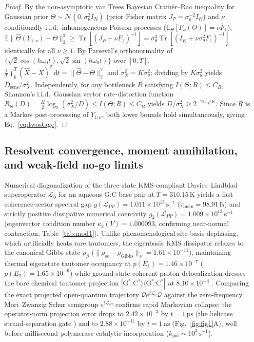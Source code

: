 \documentclass[10pt,letterpaper]{article}
\theoremstyle{plain}
\theoremstyle{definition}
\newcommand{\Lcal}{\mathcal{L}}
\newcommand{\Qcal}{\mathcal{Q}}
\newcommand{\Tr}{\operatorname{Tr}}
\begin{document}
\begin{proof}
By the non-asymptotic van Trees Bayesian Cram\'er--Rao inequality for Gaussian prior $\Theta \sim \mathcal{N}(0, \sigma_\theta^2 I_K)$ (prior Fisher matrix $J_P = \sigma_\theta^{-2}I_K$) and $\nu$ conditionally i.i.d.\ inhomogeneous Poisson processes ($\mathbb{E}_\Theta[F_\nu(\Theta)] = \nu \overline{F}_1$), $\mathbb{E}\|\widehat{\Theta}(Y_{1:\nu}) - \Theta\|_2^2 \ge \Tr[(J_P + \nu \overline{F}_1)^{-1}] = \sigma_\theta^2 \Tr[(I_K + \nu\sigma_\theta^2 \overline{F}_1)^{-1}]$ identically for all $\nu \ge 1$. By Parseval's orthonormality of $\{\sqrt{2}\cos(h\omega_0 t), \sqrt{2}\sin(h\omega_0 t)\}$ over $[0, T]$, $\frac{1}{T}\int_0^T (\widehat{X} - X)^2\,\mathrm{d}t = \|\widehat{\Theta} - \Theta\|_2^2$ and $\sigma_X^2 = K\sigma_\theta^2$; dividing by $K\sigma_\theta^2$ yields $D_{\mathrm{sens}}/\sigma_X^2$. Independently, for any bottleneck $R$ satisfying $I(\Theta; R) \le C_B$, Shannon's i.i.d.\ Gaussian vector rate-distortion function $R_\Theta(D) = \frac{K}{2}\log_2(\sigma_X^2 / D) \le I(\Theta; R) \le C_B$ \cite{garcia2026memory} yields $D/\sigma_X^2 \ge 2^{-2C_B/K}$. Since $R$ is a Markov post-processing of $Y_{1:\nu}$, both lower bounds hold simultaneously, giving Eq.~\eqref{eq:twostage}.
\end{proof}

\subsection*{Resolvent convergence, moment annihilation, and weak-field no-go limits}

Numerical diagonalization of the three-state KMS-compliant Davies--Lindblad superoperator $\Lcal_0$ for an aqueous G:C base pair at $T = 310.15\,\mathrm{K}$ yields a fast coherence-sector spectral gap $g(\Lcal_{PP}) = 1.011 \times 10^{13}\,\mathrm{s}^{-1}$ ($\tau_{\mathrm{mem}} = 98.91\,\mathrm{fs}$) and strictly positive dissipative numerical coercivity $g_2(\Lcal_{PP}) = 1.009 \times 10^{13}\,\mathrm{s}^{-1}$ (eigenvector condition number $\kappa_2(V) = 1.000093$, confirming near-normal contraction; Table~\ref{tab:mod1}). Unlike phenomenological site-basis dephasing, which artificially heats rare tautomers, the eigenbasis KMS dissipator relaxes to the canonical Gibbs state $\rho_{\beta}$ ($\|\rho_{\mathrm{ss}} - \rho_{\mathrm{Gibbs}}\|_F = 1.61 \times 10^{-11}$), maintaining thermal eigenstate tautomer occupancy at $p(E_1) = 1.46 \times 10^{-7}$ ($p(E_2) = 1.65 \times 10^{-9}$) while ground-state coherent proton delocalization dresses the bare chemical tautomer projection $|\mathrm{G}^*\text{:}\mathrm{C}^*\rangle\langle\mathrm{G}^*\text{:}\mathrm{C}^*|$ at $8.10 \times 10^{-4}$ \cite{kimsey2018nature,slocombe2021pccp}. Comparing the exact projected open-quantum trajectory $\Qcal e^{t\Lcal_0}\Qcal$ against the zero-frequency Mori--Zwanzig Schur semigroup $e^{t\Lcal_{\mathrm{eff}}}$ confirms rapid Markovian collapse: the operator-norm projection error drops to $2.42 \times 10^{-3}$ by $t = 1\,\mathrm{ps}$ (the helicase strand-separation gate \cite{slocombe2022commchem}) and to $2.88 \times 10^{-11}$ by $t = 1\,\mathrm{ns}$ (Fig.~\ref{fig:fig1}A), well before millisecond polymerase catalytic incorporation ($k_{\mathrm{pol}} \sim 10^3\,\mathrm{s}^{-1}$).
\end{document}
